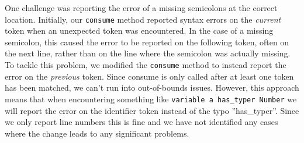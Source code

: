 One challenge was reporting the error of a missing semicolons at the correct location.
Initially, our \texttt{consume} method reported syntax errors on the \emph{current} token when an unexpected
token was encountered. In the case of a missing semicolon, this caused the error to be reported on the following token,
often on the next line, rather than on the line where the semicolon was actually missing.
To tackle this problem, we modified the \texttt{consume} method to instead report the error on the \emph{previous} token.
Since consume is only called after at least one token has been matched, we can't run into out-of-bounds issues.
However, this approach means that when encountering something like \texttt{variable a has\_typer Number} we will report
the error on the identifier token instead of the typo ''has\_typer''.
Since we only report line numbers this is fine and we have not identified any cases where the change leads to any significant problems.

